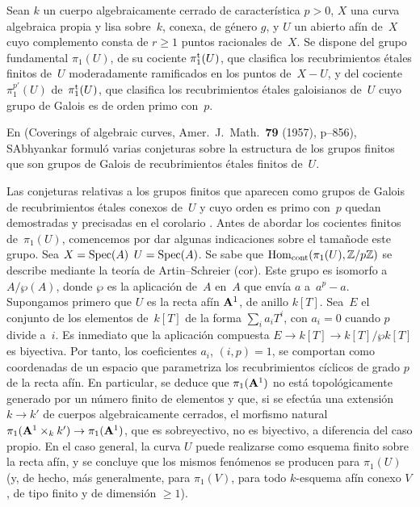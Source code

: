 
{}
{\begin{remarqueMR}
\label{XIII.2.13}
Sean $k$ un cuerpo algebraicamente cerrado de característica $p>0$, $X$ una
curva algebraica propia y lisa sobre~$k$, conexa, de género $g$, y $U$ un
abierto afín de~$X$ cuyo complemento consta de $r\geq1$ puntos racionales
de~$X$. Se dispone del grupo fundamental $\pi_1(U)$, de su cociente
$\pi_1^{\tame}(U)$, que clasifica los recubrimientos étales finitos de~$U$
moderadamente ramificados en los puntos de~$X-U$, y del cociente
$\pi_1^{p'}(U)$ de~$\pi_1^{\tame}(U)$, que clasifica los recubrimientos
étales galoisianos de~$U$ cuyo grupo de Galois es de orden primo con~$p$.

En (Coverings of algebraic curves, Amer.\ J.~Math.\ \textbf{79}
(1957), p--856), S\ptbl Abhyankar formuló varias
conjeturas sobre la estructura de los grupos finitos que son grupos de
Galois de recubrimientos étales finitos de~$U$.

Las conjeturas relativas a los grupos finitos que aparecen como grupos de
Galois de recubrimientos étales conexos de~$U$ y cuyo orden es primo con~$p$
quedan demostradas y precisadas en el corolario . Antes de abordar
los cocientes finitos de~$\pi_1(U)$, comencemos por dar algunas indicaciones
sobre el \og tamaño\fg de este grupo. Sea
{$X = \Spec(A)$}
{$U = \Spec(A)$}.
Se sabe que $\Hom_{\mathrm{cont}}(\pi_1(U), \ZZ/p\ZZ)$ se describe mediante
la teoría de Artin--Schreier (cor\ptbl {}). Este grupo es
isomorfo a $A/\wp(A)$, donde $\wp$ es la aplicación de~$A$ en~$A$ que envía
$a$ a~$a^p-a$. Supongamos primero que $U$ es la recta afín $\AA^1$, de
anillo $k[T]$. Sea~$E$ el conjunto de los elementos de~$k[T]$ de la forma
$\sum_i a_iT^i$, con $a_i = 0$ cuando $p$ divide a~$i$. Es inmediato que la
aplicación compuesta $E\to k[T]\to k[T]/\wp k[T]$ es biyectiva. Por tanto,
los coeficientes $a_i$, $(i,p)=1$, se comportan como coordenadas de un
espacio que parametriza los recubrimientos cíclicos de grado $p$ de la
recta afín. En particular, se deduce que $\pi_1(\AA^1)$ no está
topológicamente generado por un número finito de elementos y que, si se
efectúa una extensión $k\to k'$ de cuerpos algebraicamente cerrados, el
morfismo natural $\pi_1(\AA^1\times_kk')\to\pi_1(\AA^1)$, que es
sobreyectivo, no es biyectivo, a diferencia del caso propio. En el caso
general, la curva $U$ puede realizarse como esquema finito sobre la recta
afín, y se concluye que los mismos fenómenos se producen para $\pi_1(U)$
(y, de hecho, más generalmente, para $\pi_1(V)$, para todo $k$-esquema
afín conexo $V$, de tipo finito y de dimensión $\geq1$).


\end{remarqueMR}}
